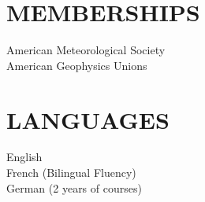 \documentclass[overlapped]{res}
\begin{document}
\begin{resume}
\section{MEMBERSHIPS}            
                {American Meteorological Society} \\
                {American Geophysics Unions}

\section{LANGUAGES}
                English \\
                French (Bilingual Fluency) \\
                German (2 years of courses) 

\end{resume}
\end{document}
